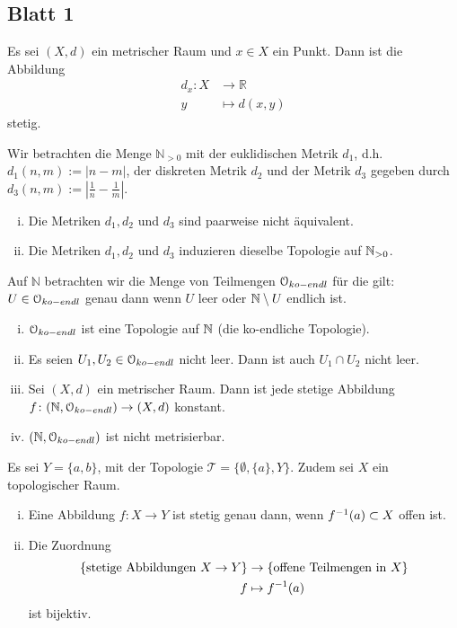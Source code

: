 \subsection*{Blatt 1}
\begin{aufgabe}
Es sei $(X,d)$ ein metrischer Raum und $x\in X$ ein Punkt. Dann ist die Abbildung
\begin{align*}
d_x\colon X& \to \mathbb R\\
y& \mapsto d(x,y)
\end{align*}
stetig.
\end{aufgabe}

\begin{aufgabe}
Wir betrachten die Menge $\mathbb N_{>0}$ mit der euklidischen Metrik $d_1$, d.h.\ $d_1(n,m):=|n-m|$, der diskreten Metrik $d_2$ und der Metrik $d_3$ gegeben durch $d_3(n,m):=|\tfrac{1}{n}-\tfrac{1}{m}|$.
\begin{enumerate}[i)]
	\item Die Metriken $d_1, d_2$ und $d_3$ sind paarweise nicht äquivalent.
	\item Die Metriken $d_1, d_2$ und $d_3$ induzieren dieselbe Topologie auf $\mathbb{N}_{>0}$.
\end{enumerate}
\end{aufgabe}

\begin{aufgabe}
	Auf $\mathbb{N}$ betrachten wir die Menge von Teilmengen $\mathcal O_{ko-endl}$ für die gilt: $U\in \mathcal O_{ko-endl}$ genau dann wenn $U$ leer oder $\mathbb{N}\setminus U$ endlich ist.
\begin{enumerate}[i)]
	\item $\mathcal O_{ko-endl}$ ist eine Topologie auf $\mathbb{N}$ (die ko-endliche Topologie).
	\item Es seien $U_1, U_2 \in \mathcal O_{ko-endl}$ nicht leer. Dann ist auch $U_1\cap U_2$ nicht leer.
	\item Sei $(X,d)$ ein metrischer Raum. Dann ist jede stetige Abbildung $f\colon (\mathbb N,\mathcal O_{ko-endl})\to (X,d)$ konstant.
	\item $(\mathbb N,\mathcal O_{ko-endl})$ ist nicht metrisierbar.
\end{enumerate}
\end{aufgabe}

\begin{aufgabe}
Es sei $Y= \{a,b\}$, mit der Topologie $\mathcal T= \{ \emptyset, \{a\}, Y\}$. Zudem sei $X$ ein topologischer Raum.
\begin{enumerate}[i)]
	\item Eine Abbildung $f\colon X\to Y$ ist stetig genau dann, wenn $f^{-1}(a)\subset X$ offen ist. 
	\item Die Zuordnung 
		\begin{align*}
		\{ \textup{stetige Abbildungen } X\to Y\} & \to \{ \textup{offene Teilmengen in } X\} \\
		f& \mapsto f^{-1} (a)
		\end{align*}
		ist bijektiv.
\end{enumerate}
\end{aufgabe}

